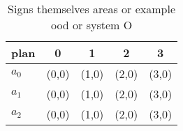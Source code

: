 \documentclass[a4paper]{article}
\begin{document}
\begin{table}
\begin{adjustbox}{width=0.5\columnwidth}
\begin{tabular}{|l|l|l|l|l|}
\hline
\textbf{plan} & \multicolumn{1}{c|}{\textbf{0}} & \multicolumn{1}{c|}{\textbf{1}} & \multicolumn{1}{c|}{\textbf{2}} & \multicolumn{1}{c|}{\textbf{3}} \\ \hline
\textbf{$a_0$}  & (0,0) & (1,0) & (2,0) & (3,0) \\ \hline
\textbf{$a_1$}  & (0,0) & (1,0) & (2,0) & (3,0) \\ \hline
\textbf{$a_2$}  & (0,0) & (1,0) & (2,0) & (3,0) \\ \hline
\end{tabular}
\end{adjustbox}
\caption{Signs themselves areas or example ood or system O
}
\end{table}
\end{document}
